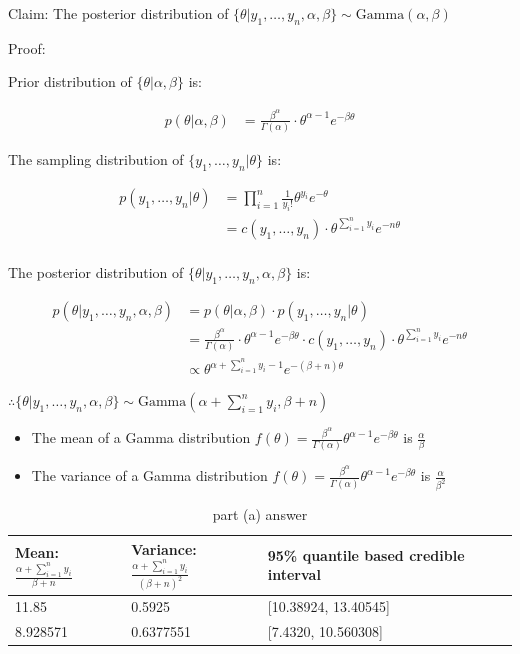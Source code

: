 \documentclass[11pt]{article}
\begin{document}
Claim: The posterior distribution of $\{\theta|y_1,\ldots,y_n,\alpha, \beta\} \sim \text{Gamma}\left( \alpha, \beta \right) $ 

Proof:

Prior distribution of $\{\theta|\alpha, \beta\}$ is: 

\begin{align*}
p(\theta|\alpha, \beta)
&= \frac{\beta^\alpha}{\Gamma(\alpha)}\cdot \theta^{\alpha-1}e^{-\beta\theta}
\end{align*}

The sampling distribution of $\{y_1,\ldots,y_n|\theta\}$ is:

\begin{align*}
p(y_1,\ldots,y_n|\theta)
&=\prod_{i=1}^{n} \frac{1}{y_i!}\theta^{y_i}e^{-\theta}\\
&=c(y_1,\ldots,y_n)\cdot \theta^{\sum_{i=1}^{n} y_i}e^{-n\theta}\\
\end{align*}

The posterior distribution of $\{\theta|y_1,\ldots,y_n, \alpha, \beta\}$ is:

\begin{align*}
p(\theta|y_1,\ldots,y_n, \alpha, \beta)
&=p(\theta|\alpha, \beta)\cdot p(y_1,\ldots,y_n|\theta)\\
&=\frac{\beta^\alpha}{\Gamma(\alpha)}\cdot \theta^{\alpha-1}e^{-\beta\theta}\cdot c(y_1,\ldots,y_n)\cdot \theta^{\sum_{i=1}^{n} y_i}e^{-n\theta}\\
&\propto \theta^{\alpha+\sum_{i=1}^{n} y_i -1}e^{-(\beta+n)\theta}
\end{align*}

$\therefore \{\theta|y_1,\ldots,y_n, \alpha, \beta\} \sim \text{Gamma}(\alpha+\sum_{i=1}^{n} y_i, \beta+n)$

\begin{itemize}
\item The mean of a Gamma distribution $f(\theta) = \frac{\beta^{\alpha}}{\Gamma(\alpha)}\theta^{\alpha-1}e^{-\beta \theta}$ is $\frac{\alpha}{\beta}$
\item The variance of a Gamma distribution $f(\theta) = \frac{\beta^{\alpha}}{\Gamma(\alpha)}\theta^{\alpha-1}e^{-\beta \theta}$ is $\frac{\alpha}{\beta^2}$
\end{itemize}

\begin{table}[htpb]
	\centering
	\caption{part (a) answer}
	\label{tab:label}
	\begin{tabular}{lll}
	\toprule
	Mean: $\frac{\alpha+\sum_{i=1}^{n} y_i}{\beta+n}$  & Variance: $\frac{\alpha+\sum_{i=1}^{n} y_i}{(\beta+n)^2}$ & 95\% quantile based credible interval\\
	\midrule
	11.85& 0.5925& [10.38924, 13.40545]\\
	8.928571&0.6377551&[7.4320, 10.560308]\\
	\bottomrule
	\end{tabular}
\end{table}
\end{document}
